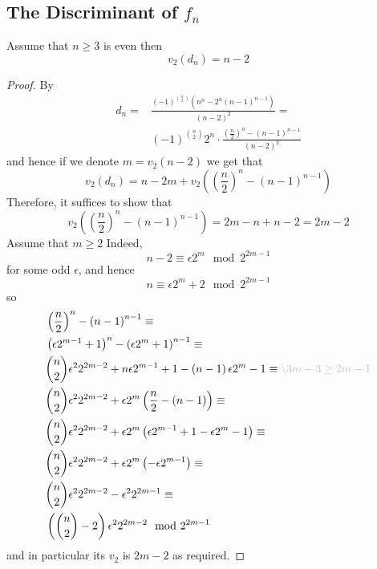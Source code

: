 \documentclass[../main.tex]{subfiles}
\begin{document}
\subsection{The Discriminant of \( f_n \)}
\begin{lemma}
  \label{lem:2-adic-valuation-of-discriminant}
Assume that $n \geq 3$ is even then 
\[
  v_2\left( d_n \right) = n - 2
\]
\end{lemma}
\begin{proof}
  By \cite{MARTIN2004213} 
  \begin{align*}
    d_n = & 
    \frac{
      \left( -1 \right)^{\binom{n}{2}}\left( n^n - 2^n \left( n - 1 \right)^{ n - 1 } \right)
    }{
      \left( n - 2 \right)^2
    } = \\
    & \left( -1 \right)^{\binom{n}{2}}2^{n} \cdot
    \frac{
      \left( \frac{n}{2} \right)^n - \left( n - 1 \right)^{ n - 1 }
    }{
      \left( n - 2 \right)^2
    }
  \end{align*}
  and hence if we denote $m = v_2\left( n - 2 \right)$ we get that 
  \[
    v_2\left( d_n \right) = n - 2m + v_2\left( \left( \frac{n}{2} \right)^n - \left( n - 1 \right)^{ n - 1 } \right)
  \]
Therefore, it suffices to show that 
\[
  v_2\left( \left( \frac{n}{2} \right)^n - \left( n - 1 \right)^{ n - 1 } \right) = 
  2m - n + n - 2 = 2m - 2
\]
Assume that $m \geq 2$
Indeed,
\[
  n - 2 \equiv \epsilon 2^m \mod 2^{2m-1}
\]
for some odd $\epsilon$, and hence 
\[
  n \equiv \epsilon 2^m + 2 \mod 2^{2m-1}
\]
so 
\begin{align*}
  & \left( \frac{n}{2} \right)^n - \left( n - 1 \right)^{n - 1} \equiv \\
  & \left( \epsilon 2^{m - 1} + 1 \right)^n - \left( \epsilon 2^m + 1 \right)^{ n - 1 } \equiv \\
  & \binom{n}{2} \epsilon^2 2^{2m - 2} + n\epsilon 2^{m - 1} + 1 - \left( n - 1 \right) \epsilon 2^m - 1 \equiv 
  \justification{3m - 3 \geq 2m - 1} \\ 
  & \binom{n}{2} \epsilon^2 2^{2m - 2} + 
  \epsilon 2^m \left(  
  \frac{n}{2} - \left( n - 1 \right)
  \right) \equiv \\ 
  & \binom{n}{2} \epsilon^2 2^{2m - 2} + 
  \epsilon 2^m \left(  
    \epsilon 2^{m - 1} + 1 - \epsilon 2^m - 1
  \right) \equiv \\
  & \binom{n}{2} \epsilon^2 2^{2m - 2} + \epsilon 2^m \left( -\epsilon 2^{m-1} \right) \equiv \\
  & \binom{n}{2} \epsilon^2 2^{2m - 2} - \epsilon^2 2^{2m - 1} \equiv \\
  & \left( \binom{n}{2} - 2 \right) \epsilon^2 2^{2m - 2} \mod 2^{2m - 1}
\end{align*}
and in particular its $v_2$ is $2m - 2$ as required.


\end{proof}
\end{document}
